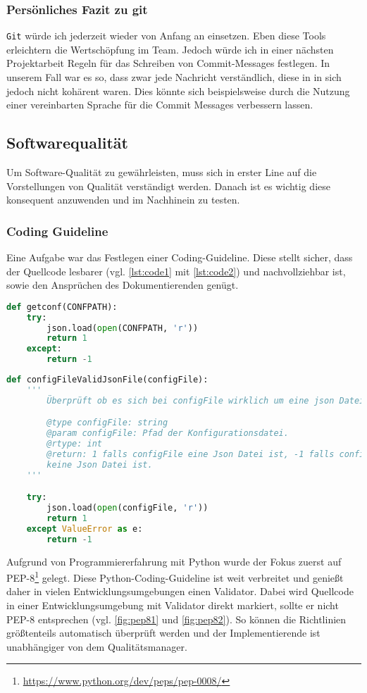 \subsubsection*{Persönliches Fazit zu git}
\texttt{Git} würde ich jederzeit wieder von Anfang an einsetzen. Eben diese Tools erleichtern die Wertschöpfung im Team. Jedoch würde ich in einer nächsten Projektarbeit Regeln für das Schreiben von Commit-Messages festlegen. In unserem Fall war es so, dass zwar jede Nachricht verständlich, diese in in sich jedoch nicht kohärent waren. Dies könnte sich beispielsweise durch die Nutzung einer vereinbarten Sprache für die Commit Messages verbessern lassen.
\subsection{Softwarequalität}
Um Software-Qualität zu gewährleisten, muss sich in erster Line auf die Vorstellungen von Qualität verständigt werden. Danach ist es wichtig diese konsequent anzuwenden und im Nachhinein zu testen.
\subsubsection{Coding Guideline}
Eine Aufgabe war das Festlegen einer Coding-Guideline. Diese stellt sicher, dass der Quellcode lesbarer (vgl. \autoref{lst:code1} mit \autoref{lst:code2}) und nachvollziehbar ist, sowie den Ansprüchen des Dokumentierenden genügt.

\begin{lstlisting}[language=python,caption={Schwer lesbaren Code},label={lst:code1}]
def getconf(CONFPATH):
    try:
        json.load(open(CONFPATH, 'r'))
        return 1
    except:
        return -1
\end{lstlisting}
\begin{lstlisting}[language=python,caption={Besser lesbaren Code},label={lst:code2}]
def configFileValidJsonFile(configFile):
    '''
        Überprüft ob es sich bei configFile wirklich um eine json Datei handelt.

        @type configFile: string
        @param configFile: Pfad der Konfigurationsdatei.
        @rtype: int
        @return: 1 falls configFile eine Json Datei ist, -1 falls configFile
        keine Json Datei ist.
    '''

    try:
        json.load(open(configFile, 'r'))
        return 1
    except ValueError as e:
        return -1
\end{lstlisting}

Aufgrund von Programmiererfahrung mit Python wurde der Fokus zuerst auf PEP-8\footnote{\url{https://www.python.org/dev/peps/pep-0008/}} gelegt. Diese Python-Coding-Guideline ist weit verbreitet und genießt daher in vielen Entwicklungsumgebungen einen Validator. Dabei wird Quellcode in einer Entwicklungsumgebung mit Validator direkt markiert, sollte er nicht PEP-8 entsprechen (vgl. \autoref{fig:pep81} und \autoref{fig:pep82}). So können die Richtlinien größtenteils automatisch überprüft werden und der Implementierende ist unabhängiger von dem Qualitätsmanager.

